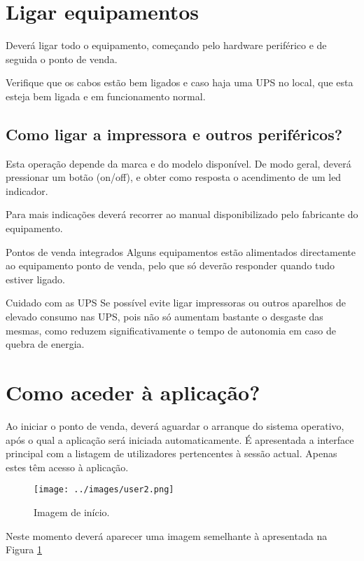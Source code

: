 \documentclass[a4paper,11pt,openany]{memoir}
\newcommand\dica{\texttt{[image: ../small-n-flat-master/png/96/light-bulb.png]}}
\newcommand\perigo{\texttt{[image: ../small-n-flat-master/png/96/shield-warning.png]}}
\newcommand{\bcdica}[2]{\vspace{5mm}\begin{bclogo}[couleur=blue!30,logo=\dica]{\hspace{0.7cm}#1}{#2}\end{bclogo}}
\newcommand{\bcperigo}[2]{\vspace{5mm}\begin{bclogo}[couleur=red!30,logo=\perigo]{\hspace{0.7cm}#1}{#2}\end{bclogo}}
\begin{document}
\section{Ligar equipamentos}

Deverá ligar todo o equipamento, começando pelo hardware periférico e de seguida
o ponto de venda.

Verifique que os cabos estão bem ligados e caso haja uma UPS no local, que esta esteja 
bem ligada e em funcionamento normal.

\subsection{Como ligar a impressora e outros periféricos?}
Esta operação depende da marca e do modelo disponível. De modo geral, deverá
pressionar um botão (on/off), e obter como resposta o acendimento de um led
indicador.

Para mais indicações deverá recorrer ao manual disponibilizado pelo fabricante do
equipamento.

\bcdica{Pontos de venda integrados}{
Alguns equipamentos estão alimentados directamente ao equipamento ponto de venda, 
pelo que só deverão responder quando tudo estiver ligado.
}

\bcperigo{Cuidado com as UPS}{
Se possível evite ligar impressoras ou outros aparelhos de elevado consumo nas UPS,
pois não só aumentam bastante o desgaste das mesmas, como reduzem significativamente o tempo de autonomia
em caso de quebra de energia.
}



\section{Como aceder à aplicação?}

Ao iniciar o ponto de venda, deverá aguardar o arranque do sistema operativo, após
o qual a aplicação será iniciada automaticamente. É apresentada a interface
principal com a listagem de utilizadores pertencentes à sessão actual. Apenas estes
têm acesso à aplicação.


\begin{figure}
\begin{center}
\texttt{[image: ../images/user2.png]}
\caption[Submanifold]{Imagem de início.}
\label{welcomeScreen}
\end{center}
\end{figure}


Neste momento deverá aparecer uma imagem semelhante à apresentada na Figura \ref{welcomeScreen}
\end{document}
